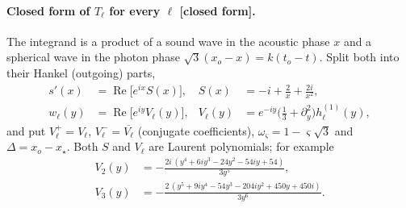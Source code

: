 \documentclass[11pt]{article}
\theoremstyle{definition}
\theoremstyle{remark}
\newcommand{\st}[1]{\textsf{[#1]}}
\begin{document}
\paragraph{Closed form of $T_\ell$ for every $\ell$ \st{closed form}.}
The integrand is a product of a sound wave in the acoustic phase $x$ and a spherical wave in
the photon phase $\sqrt3(x_o-x)=k(t_o-t)$. Split both into their Hankel (outgoing) parts,
\begin{equation}\label{eq:hankel-split}
\begin{aligned}
s'(x)&=\operatorname{Re}\big[e^{ix}S(x)\big],& S(x)&=-i+\frac2x+\frac{2i}{x^2},\\
w_\ell(y)&=\operatorname{Re}\big[e^{iy}V_\ell(y)\big],&
V_\ell(y)&=e^{-iy}\Big(\frac13+\partial_y^2\Big)h^{(1)}_\ell(y),
\end{aligned}
\end{equation}
and put $V^{+}_\ell=V_\ell$, $V^{-}_\ell=\overline{V_\ell}$ (conjugate coefficients),
$\omega_\varsigma=1-\varsigma\sqrt3$ and $\Delta=x_o-x_\star$. Both $S$ and $V_\ell$ are Laurent
polynomials; for example
\[
\begin{aligned}
V_2(y)&=-\frac{2i\,(y^4+6iy^3-24y^2-54iy+54)}{3y^5},\\
V_3(y)&=-\frac{2\,(y^5+9iy^4-54y^3-204iy^2+450y+450i)}{3y^6}.
\end{aligned}
\]
\end{document}

